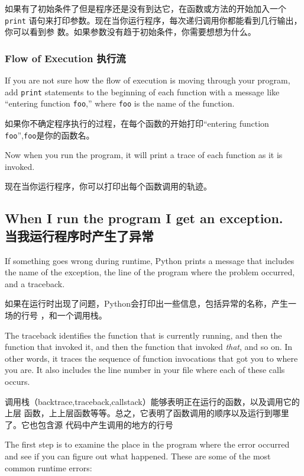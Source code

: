 \documentclass[10pt]{book}
\begin{document}
\begin{CJK}{UTF8}{gbsn}
如果有了初始条件了但是程序还是没有到达它，在函数或方法的开始加入一个{\tt print}
语句来打印参数。现在当你运行程序，每次递归调用你都能看到几行输出，你可以看到参
数。如果参数没有趋于初始条件，你需要想想为什么。

\subsubsection{Flow of Execution 执行流}

If you are not sure how the flow of execution is moving through
your program, add {\tt print} statements to the beginning of each
function with a message like ``entering function {\tt foo},'' where
{\tt foo} is the name of the function.

如果你不确定程序执行的过程，在每个函数的开始打印``entering function {\tt
foo}'',{\tt foo}是你的函数名。

Now when you run the program, it will print a trace of each
function as it is invoked.

现在当你运行程序，你可以打印出每个函数调用的轨迹。

\subsection{When I run the program I get an exception.\\当我运行程序时产生了异常}

If something goes wrong during runtime, Python
prints a message that includes the name of the
exception, the line of the program where the problem occurred,
and a traceback.

如果在运行时出现了问题，Python会打印出一些信息，包括异常的名称，产生一场的行号
，和一个调用栈。

The traceback identifies the function that is currently running,
and then the function that invoked it, and then the function that
invoked {\em that}, and so on.  In other words, it traces the
sequence of function invocations that got you to where you are.  It
also includes the line number in your file where each of these
calls occurs.

调用栈（backtrace,traceback,callstack）能够表明正在运行的函数，以及调用它的上层
函数，上上层函数等等。总之，它表明了函数调用的顺序以及运行到哪里了。它也包含源
代码中产生调用的地方的行号

The first step is to examine the place in the program where
the error occurred and see if you can figure out what happened.
These are some of the most common runtime errors:


\end{CJK}
\end{document}
